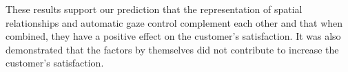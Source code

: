 \documentclass[a4paper, 10pt, conference]{ieeeconf}     %
\begin{document}


These results support our prediction that the representation of spatial relationships and automatic gaze control complement each other and that when combined, they have a positive effect on the customer's satisfaction. 
It was also demonstrated that the factors by themselves did not contribute to increase the customer's satisfaction.
\end{document}

